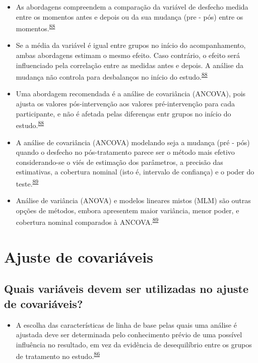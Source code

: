 \documentclass[
]{book}
\providecommand{\tightlist}{%
  \setlength{\itemsep}{0pt}\setlength{\parskip}{0pt}}
\begin{document}
\begin{itemize}
\item
  As abordagens compreendem a comparação da variável de desfecho medida entre os momentos antes e depois ou da sua mudança (pre - pós) entre os momentos.\textsuperscript{\protect\hyperlink{ref-Vickers2001}{88}}
\item
  Se a média da variável é igual entre grupos no início do acompanhamento, ambas abordagens estimam o mesmo efeito. Caso contrário, o efeito será influenciado pela correlação entre as medidas antes e depois. A análise da mudança não controla para desbalanços no início do estudo.\textsuperscript{\protect\hyperlink{ref-Vickers2001}{88}}
\item
  Uma abordagem recomendada é a análise de covariância (ANCOVA), pois ajusta os valores pós-intervenção aos valores pré-intervenção para cada participante, e não é afetada pelas diferenças entr grupos no início do estudo.\textsuperscript{\protect\hyperlink{ref-Vickers2001}{88}}
\item
  A análise de covariância (ANCOVA) modelando seja a mudança (pré - pós) quando o desfecho no pós-tratamento parece ser o método mais efetivo considerando-se o viés de estimação dos parâmetros, a precisão das estimativas, a cobertura nominal (isto é, intervalo de confiança) e o poder do teste.\textsuperscript{\protect\hyperlink{ref-OConnell2017}{89}}
\item
  Análise de variância (ANOVA) e modelos lineares mistos (MLM) são outras opções de métodos, embora apresentem maior variância, menor poder, e cobertura nominal comparados à ANCOVA.\textsuperscript{\protect\hyperlink{ref-OConnell2017}{89}}
\end{itemize}

\hypertarget{ajuste-de-covariaveis}{%
\section{Ajuste de covariáveis}\label{ajuste-de-covariaveis}}

\hypertarget{quais-variuxe1veis-devem-ser-utilizadas-no-ajuste-de-covariuxe1veis}{%
\subsection{Quais variáveis devem ser utilizadas no ajuste de covariáveis?}\label{quais-variuxe1veis-devem-ser-utilizadas-no-ajuste-de-covariuxe1veis}}

\begin{itemize}
\tightlist
\item
  A escolha das características de linha de base pelas quais uma análise é ajustada deve ser determinada pelo conhecimento prévio de uma possível influência no resultado, em vez da evidência de desequilíbrio entre os grupos de tratamento no estudo.\textsuperscript{\protect\hyperlink{ref-roberts1999}{86}}
\end{itemize}
\end{document}
